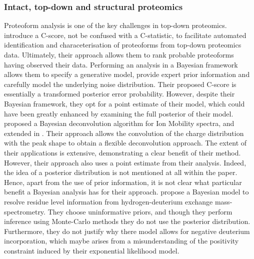 \documentclass[12pt,english, journal=jpr, layout=twocolumn]{article}
\begin{document}
\subsubsection{Intact, top-down and structural proteomics}
Proteoform analysis is one of the key challenges in top-down proteomics. \citet{Leduc::2014} introduce a C-score, not be confused with a C-statistic, to facilitate automated identification and characeterisation of proteoforms from top-down proteomics data. Ultimately, their approach allows them to rank probable proteoforms having observed their data. Performing an analysis in a Bayesian framework allows them to specify a generative model, provide expert prior information and carefully model the underlying noise distribution. Their proposed C-score is essentially a transformed posterior error probability. However, despite their Bayesian framework, they opt for a point estimate of their model, which could have been greatly enhanced by examining the full posterior of their model. \citet{Marty::2015} proposed a Bayesian deconvolution algorithm for Ion Mobility spectra, and extended in \citet{Kostelic::2021}. Their approach allows the convolution of the charge distribution with the peak shape to obtain a flexible deconvolution approach. The extent of their applications is extensive, demonstrating a clear benefit of their method. However, their approach also uses a point estimate from their analysis. Indeed, the idea of a posterior distribution is not mentioned at all within the paper. Hence, apart from the use of prior information, it is not clear what particular benefit a Bayesian analysis has for their approach. \citet{Saltzberg::2017} propose a Bayesian model to resolve residue level information from hydrogen-deuterium exchange mass-spectrometry. They choose uninformative priors, and though they perform inference using Monte-Carlo methods they do not use the posterior distribution. Furthermore, they do not justify why there model allows for negative deuterium incorporation, which maybe arises from a misunderstanding of the positivity constraint induced by their exponential likelihood model.  
\end{document}
